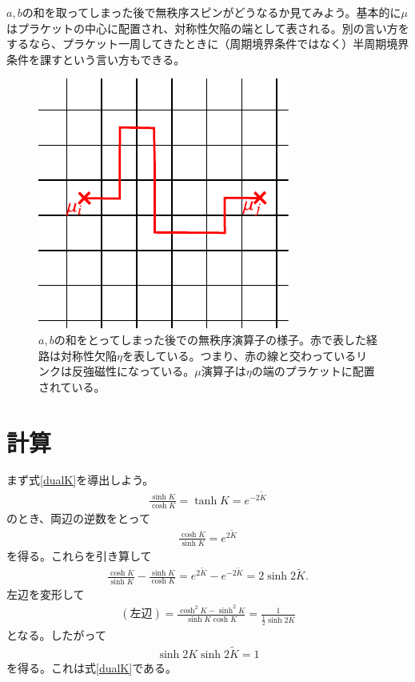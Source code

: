\documentclass[a4paper,12pt,dvipdfmx]{jlreq}
\newcommand{\Kt}{\widetilde{K}}
\begin{document}
$a,b$の和を取ってしまった後で無秩序スピンがどうなるか見てみよう。基本的に$\mu$はプラケットの中心に配置され、対称性欠陥の端として表される。別の言い方をするなら、プラケット一周してきたときに（周期境界条件ではなく）半周期境界条件を課すという言い方もできる。


\begin{figure}
  \centering
  \includegraphics{disorder2.pdf}
  \caption{$a,b$の和をとってしまった後での無秩序演算子の様子。赤で表した経路は対称性欠陥$\eta$を表している。つまり、赤の線と交わっているリンクは反強磁性になっている。$\mu$演算子は$\eta$の端のプラケットに配置されている。}
  \label{fig:disorder2}
\end{figure}

\appendix
\section{計算}
\label{sec:calculation}
まず式\eqref{dualK}を導出しよう。
\begin{align}
  \frac{\sinh K}{\cosh K}=\tanh K = e^{-2\Kt}
  \label{KKt}
\end{align}
のとき、両辺の逆数をとって
\begin{align}
  \frac{\cosh K}{ \sinh K} = e^{2\Kt}
\end{align}
を得る。これらを引き算して
\begin{align}
  \frac{\cosh K}{\sinh K}-\frac{\sinh K}{\cosh K}=e^{2\Kt}-e^{-2\Kt}=2\sinh 2\Kt.
\end{align}
左辺を変形して
\begin{align}
  (\text{左辺})=\frac{\cosh^2K-\sinh^2 K}{\sinh K \cosh K}=\frac{1}{\frac{1}{2}\sinh 2K}
\end{align}
となる。したがって
\begin{align}
  \sinh 2K \sinh 2\Kt =1
\end{align}
を得る。これは式\eqref{dualK}である。
\end{document}
